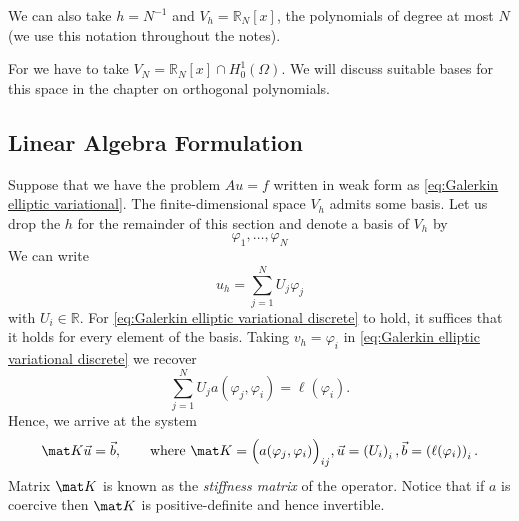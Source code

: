 \begin{example}[Polynomials]
    We can also take $h = N^{-1}$ and $V_h = \mathbb R_N[x]$, the polynomials of degree at most $N$ (we use this notation throughout the notes).
\end{example}
For  we have to take $V_N = \mathbb R_N[x] \cap H_0^1 (\Omega)$. We will discuss suitable bases for this space in the chapter on orthogonal polynomials.

\subsection{Linear Algebra Formulation}
\label{sec:Galerkin elliptic linear algebra}
Suppose that we have the problem $A u = f$ written in weak form as \eqref{eq:Galerkin elliptic variational}.
The finite-dimensional space $V_h$ admits some basis.
Let us drop the $h$ for the remainder of this section and denote a basis of $V_h$ by
\begin{equation*}
    \varphi_1, \dots, \varphi_{N}
\end{equation*}
We can write
\begin{equation*}
    u_h = \sum_{j=1}^{N} U_j \varphi_j
\end{equation*}
with $U_i \in \mathbb R$.
For \eqref{eq:Galerkin elliptic variational discrete} to hold, it suffices that it holds for every element of the basis.
Taking $v_h = \varphi_i$ in \eqref{eq:Galerkin elliptic variational discrete} we recover
\begin{equation*}
    \sum_{j=1}^{N} U_j a(\varphi_j, \varphi_i) = \ell(\varphi_i).
\end{equation*}
Hence, we arrive at the system
\begin{equation}
    \label{eq:Galerkin elliptic linear algebra}
    \mat K \vec u = \vec b, \qquad
    \text{where } \mat K = \Big( a(\varphi_j, \varphi_i)\Big)_{ij},
    \vec u = \left(U_i\right)_i,
    \vec b = \left(\ell(\varphi_i)\right)_i.
\end{equation}
Matrix $\mat K$ is known as the \emph{stiffness matrix} of the operator.
Notice that if $a$ is coercive then $\mat K$ is positive-definite and hence invertible.

